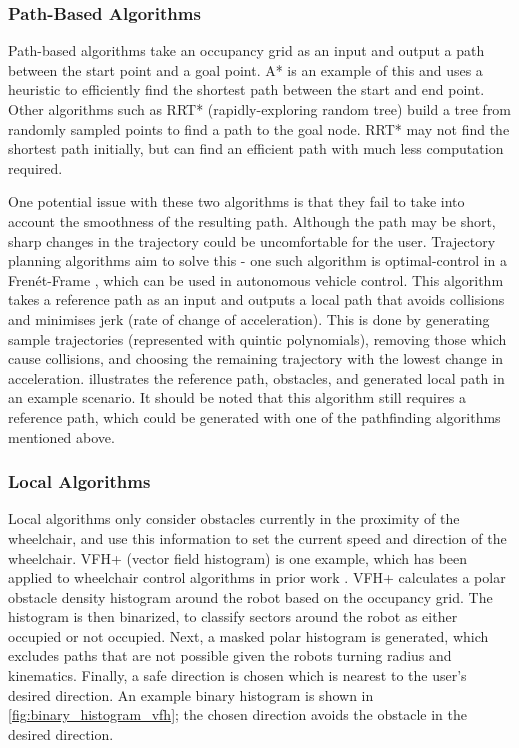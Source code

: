 \documentclass[12pt]{article}
\begin{document}
\subsubsection{Path-Based Algorithms}
Path-based algorithms take an occupancy grid as an input and output a path between the start point and a goal point.
A* is an example of this and uses a heuristic to efficiently find the shortest path between the start and end point.
Other algorithms such as RRT* (rapidly-exploring random tree) \cite{karamanSamplingbasedAlgorithmsOptimal2011} build a tree from randomly sampled points
to find a path to the goal node. RRT* may not find the shortest path initially, but can find an efficient path with much less
computation required.

One potential issue with these two algorithms is that they fail to take into account the smoothness of the resulting path.
Although the path may be short, sharp changes in the trajectory could be uncomfortable for the user.
Trajectory planning algorithms aim to solve this - one such algorithm is optimal-control in a Fren\'et-Frame \cite{werlingOptimalTrajectoryGeneration2010},
which can be used in autonomous vehicle control.
This algorithm takes a reference path as an input and outputs a local path that avoids collisions and minimises jerk (rate of change of acceleration).
This is done by generating sample trajectories (represented with quintic polynomials), removing those which cause collisions, and choosing
the remaining trajectory with the lowest change in acceleration.  illustrates the reference path, obstacles, and generated
local path in an example scenario.
It should be noted that this algorithm still requires a reference path, which could be generated
with one of the pathfinding algorithms mentioned above.

\subsubsection{Local Algorithms}
Local algorithms only consider obstacles currently in the proximity of the wheelchair,
and use this information to set the current speed and direction of the wheelchair.
VFH+ (vector field histogram) \cite{ulrichVFHReliableObstacle1998} is one example, which
has been applied to wheelchair control algorithms in prior work \cite{tomariEnhancingWheelchairControl2014}.
VFH+ calculates a polar obstacle density histogram around the robot based on the occupancy grid.
The histogram is then binarized, to classify sectors around the robot as either occupied or not occupied.
Next, a masked polar histogram is generated, which excludes paths that are not possible given the robots
turning radius and kinematics. Finally, a safe direction is chosen which is nearest to the user's desired direction.
An example binary histogram is shown in \cref{fig:binary_histogram_vfh}; the chosen direction avoids the obstacle in the
desired direction.
\end{document}
